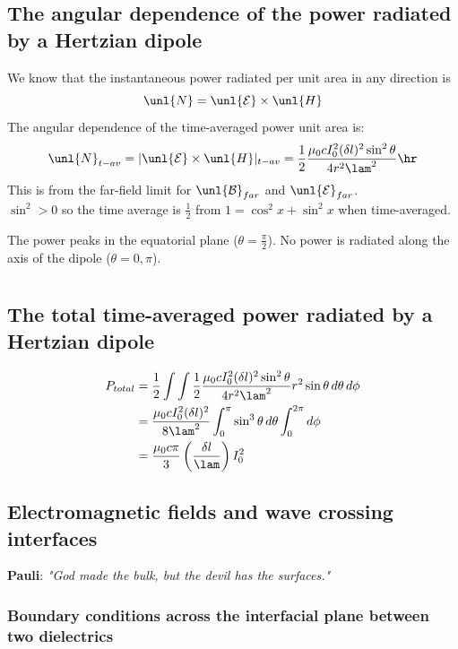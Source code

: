 \documentclass[a4paper, 11pt, normalem]{report}
\renewcommand\E{\mathcal{E}}
\newcommand\uE{\unl{\E}}
\renewcommand\B{\mathcal{B}}
\newcommand\uB{\unl{\B}}
\begin{document}
\section{The angular dependence of the power radiated by a Hertzian dipole}
We know that the instantaneous power radiated per unit area in any direction is
\begin{equation}
	\unl{N} = \uE\times\unl{H}
\end{equation}
The angular dependence of the time-averaged power unit area is:
\begin{equation}
	\unl{N}_{t-av} = |\uE\times\unl{H}|_{t-av} = \frac{1}{2}\frac{\mu_0cI_0^2(\delta l)^2\sin^2\theta}{4r^2\lam^2}\hr
\end{equation}
This is from the far-field limit for $\uB_{far}$ and $\uE_{far}$. \\
$\sin^2 > 0$ so the time average is $\frac{1}{2}$ from $1 = \cos^2x + \sin^2x$ when time-averaged.

The power peaks in the equatorial plane ($\theta = \frac{\pi}{2}$).
No power is radiated along the axis of the dipole ($\theta = 0,\pi$).

\chapter{}
\section{The total time-averaged power radiated by a Hertzian dipole}
\begin{align}
	P_{total} &= \frac{1}{2}\int\int \frac{1}{2}\frac{\mu_0cI_0^2(\delta l)^2\sin^2\theta}{4r^2\lam^2}r^2\sin\theta\,d\theta\,d\phi \\
	          &= \frac{\mu_0cI_0^2(\delta l)^2}{8\lam^2}\int_0^\pi \sin^3\theta\,d\theta \int_0^{2\pi} d\phi \\
           	  &= \frac{\mu_0c\pi}{3}\left(\frac{\delta l}{\lam}\right)I_0^2
\end{align}

\section{Electromagnetic fields and wave crossing interfaces}
\textbf{Pauli}: \emph{"God made the bulk, but the devil has the surfaces."}

\subsection{Boundary conditions across the interfacial plane between two dielectrics}
\end{document}
